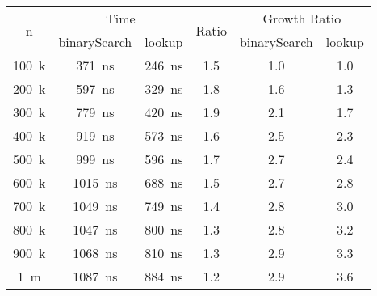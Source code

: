 \documentclass[a4paper, 11pt]{article}
\begin{document}
    \begin{table}[h]
        \centering
        \small
\begin{tabular}{|c|c|c|c|c|c|}
\hline
\multirow{2}{*}{n} & \multicolumn{2}{c|}{Time}          & \multirow{2}{*}{Ratio}& \multicolumn{2}{c|}{Growth Ratio}\\\cline{2-3}\cline{5-6}
                   & binarySearch & lookup&                                     & binarySearch  & lookup\\
\hline
\SI{100}{k} & \SI{371}{\nano\second}  & \SI{246}{\nano\second} & \num{1.5} & \num{1.0} & \num{1.0}\\
\SI{200}{k} & \SI{597}{\nano\second}  & \SI{329}{\nano\second} & \num{1.8} & \num{1.6} & \num{1.3}\\
\SI{300}{k} & \SI{779}{\nano\second}  & \SI{420}{\nano\second} & \num{1.9} & \num{2.1} & \num{1.7}\\
\SI{400}{k} & \SI{919}{\nano\second}  & \SI{573}{\nano\second} & \num{1.6} & \num{2.5} & \num{2.3}\\
\SI{500}{k} & \SI{999}{\nano\second}  & \SI{596}{\nano\second} & \num{1.7} & \num{2.7} & \num{2.4}\\
\SI{600}{k} & \SI{1015}{\nano\second} & \SI{688}{\nano\second} & \num{1.5} & \num{2.7} & \num{2.8}\\
\SI{700}{k} & \SI{1049}{\nano\second} & \SI{749}{\nano\second} & \num{1.4} & \num{2.8} & \num{3.0}\\
\SI{800}{k} & \SI{1047}{\nano\second} & \SI{800}{\nano\second} & \num{1.3} & \num{2.8} & \num{3.2}\\
\SI{900}{k} & \SI{1068}{\nano\second} & \SI{810}{\nano\second} & \num{1.3} & \num{2.9} & \num{3.3}\\
\SI{1}{m}   & \SI{1087}{\nano\second} & \SI{884}{\nano\second} & \num{1.2} & \num{2.9} & \num{3.6}\\
\hline
\end{tabular}
    \caption{}
    \label{tab:growth}
    \end{table}
\clearpage
\end{document}
